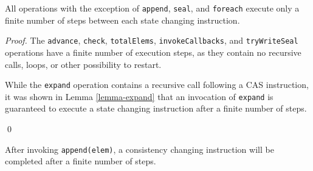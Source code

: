 \documentclass[runningheads,a4paper]{llncs}
\begin{document}
\begin{lemma}\label{lemma-finite-steps-state-change}
All operations with the exception of \verb=append=, \verb=seal=, and
\verb=foreach= execute only a finite number of steps between each state
changing instruction.
\end{lemma}

\begin{proof} The \verb=advance=, \verb=check=, \verb=totalElems=,
\verb=invokeCallbacks=, and \verb=tryWriteSeal= operations have a finite
number of execution steps, as they contain no recursive calls, loops, or other
possibility to restart.

While the \verb=expand= operation contains a recursive call following a CAS
instruction, it was shown in Lemma \ref{lemma-expand} that an invocation of
\verb=expand= is guaranteed to execute a state changing instruction after a
finite number of steps.

\qed
\end{proof}


\begin{lemma}[Append]\label{lemma-append}
After invoking \verb=append(elem)=, a consistency changing instruction will be
completed after a finite number of steps.
\end{lemma}
\end{document}
